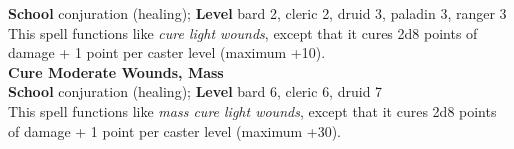 \textbf{School} conjuration (healing); \textbf{Level} bard 2, cleric 2, druid 3, paladin 3, ranger 3\\
This spell functions like \textit{cure light wounds}, except that it cures 2d8 points of damage + 1 point per caster level (maximum +10).\\
\textbf{Cure Moderate Wounds, Mass}\\
\textbf{School} conjuration (healing); \textbf{Level} bard 6, cleric 6, druid 7\\
This spell functions like \textit{mass cure light wounds}, except that it cures 2d8 points of damage + 1 point per caster level (maximum +30).\\
